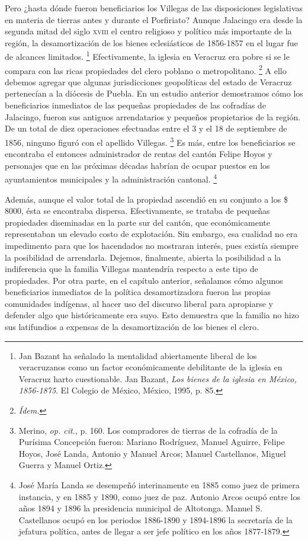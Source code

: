 \documentclass[14pt,twoside,final]{extbook} %
\let\oldfootnote\footnote
\renewcommand\footnote[1]{%
\oldfootnote{\hspace{1mm}#1}}
\begin{document}
Pero ¿hasta dónde fueron beneficiarios los Villegas de las disposiciones legislativas en materia de tierras antes y durante el Porfiriato? Aunque Jalacingo era desde la segunda mitad del siglo \textsc{xviii} el centro religioso y político más importante de la región, la desamortización de los bienes eclesiásticos de 1856-1857 en el lugar fue de alcances limitados.\footnote{Jan Bazant ha señalado la mentalidad abiertamente liberal de los veracruzanos como un factor económicamente debilitante de la iglesia en Veracruz harto cuestionable. Jan Bazant, \emph{Los bienes de la iglesia en México, 1856-1875}. El Colegio de México, México, 1995, p. 85.} Efectivamente, la iglesia en Veracruz era pobre si se le compara con las ricas propiedades del clero poblano o metropolitano.\footnote{\em Ídem.} A ello debemos agregar que algunas jurisdicciones geopolíticas del estado de Veracruz pertenecían a la diócesis de Puebla. En un estudio anterior demostramos cómo los beneficiarios inmediatos de las pequeñas propiedades de las cofradías de Jalacingo, fueron sus antiguos arrendatarios y pequeños propietarios de la región. De un total de diez operaciones efectuadas entre el 3 y el 18 de septiembre de 1856, ninguno figuró con el apellido Villegas.\footnote{Merino, \emph{op. cit.}, p. 160. Los compradores de tierras de la cofradía de la Purísima Concepción fueron: Mariano Rodríguez, Manuel Aguirre, Felipe Hoyos, José Landa, Antonio y Manuel Arcos; Manuel Castellanos, Miguel Guerra y Manuel Ortiz.} Es más, entre los beneficiarios se encontraba el entonces administrador de rentas del cantón Felipe Hoyos y personajes que en las próximas décadas habrían de ocupar puestos en los ayuntamientos municipales y la administración cantonal.\footnote{José María Landa se desempeñó interinamente en 1885 como juez de primera instancia, y en 1885 y 1890, como juez de paz. Antonio Arcos ocupó entre los años 1894 y 1896 la presidencia municipal de Altotonga. Manuel S. Castellanos ocupó en los periodos 1886-1890 y 1894-1896 la secretaría de la jefatura política, antes de llegar a ser jefe político en los años 1877-1879.}

Además, aunque el valor total de la propiedad ascendió en su conjunto a los \$ 8000, ésta se encontraba dispersa. Efectivamente, se trataba de pequeñas propiedades diseminadas en la parte sur del cantón, que económicamente representaban un elevado costo de explotación. Sin embargo, esa cualidad no era impedimento para que los hacendados no mostraran interés, pues existía siempre la posibilidad de arrendarla. Dejemos, finalmente, abierta la posibilidad a la indiferencia que la familia Villegas mantendría respecto a este tipo de propiedades. Por otra parte, en el capítulo anterior, señalamos cómo algunos beneficiarios inmediatos de la política desamortizadora fueron las propias comunidades indígenas, al hacer uso del discurso liberal para apropiarse y defender algo que históricamente era suyo. Esto demuestra que la familia no hizo sus latifundios a expensas de la desamortización de los bienes el clero.
\end{document}
